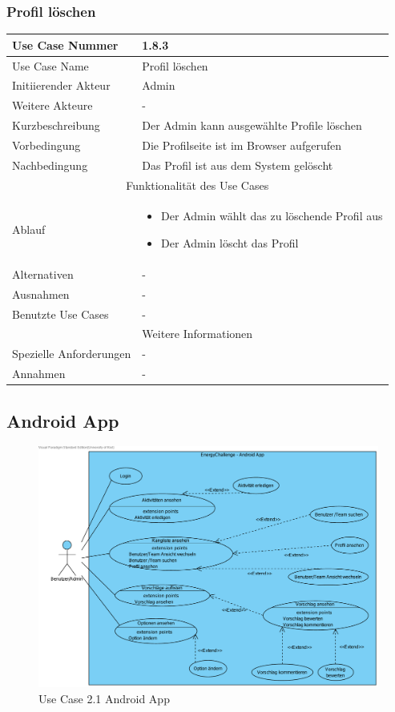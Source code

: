 \documentclass[10pt,a4paper]{article}
\begin{document}
			\subsubsection{Profil l\"oschen}
		\begin{tabularx}{\textwidth}{|l|X|}
		\hline Use Case Nummer & 1.8.3 \\ 
		\hline Use Case Name & Profil l\"oschen \\ 
		\hline Initiierender Akteur & Admin \\
		\hline Weitere Akteure & - \\
		\hline Kurzbeschreibung & Der Admin kann ausgew\"ahlte Profile l\"oschen \\
		\hline Vorbedingung & Die Profilseite ist im Browser aufgerufen \\
		\hline Nachbedingung & Das Profil ist aus dem System gel\"oscht \\
		\hline \multicolumn{2}{|c|}{Funktionalität des Use Cases}\\
		\hline  Ablauf & \begin{itemize}
					\item Der Admin w\"ahlt das zu löschende Profil aus
					\item Der Admin l\"oscht das Profil
				\end{itemize}\\
		\hline Alternativen & - \\
		\hline Ausnahmen & - \\
		\hline Benutzte Use Cases & - \\
		\hline \multicolumn{2}{|c|}{Weitere Informationen} \\
		\hline Spezielle Anforderungen & - \\
		\hline Annahmen & - \\
		\hline
		\end{tabularx}

\subsection{Android App}
	\begin{figure}[H]
	\centering
	\includegraphics[width=\linewidth]{gfx/androidapp/overview.pdf}
	\caption{Use Case 2.1 Android App}
	\end{figure}
\end{document}
